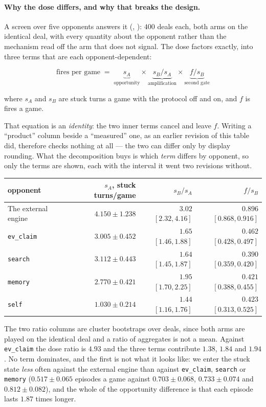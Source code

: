 \documentclass[11pt,letterpaper]{article}
\begin{document}
\paragraph{Why the dose differs, and why that breaks the design.} A screen over
five opponents answers it
(, ):
$400$ deals each, both arms on the identical deal, with every quantity about
the opponent rather than the mechanism read off the arm that does not signal.
The dose factors exactly, into three terms that are each opponent-dependent:

\[
\text{fires per game} \;=\;
\underbrace{s_A}_{\text{opportunity}} \times
\underbrace{s_B / s_A}_{\text{amplification}} \times
\underbrace{f / s_B}_{\text{second gate}}
\]

\noindent where $s_A$ and $s_B$ are stuck turns a game with the protocol off
and on, and $f$ is fires a game.

\noindent That equation is an \emph{identity}: the two inner terms cancel and
leave $f$. Writing a ``product'' column beside a ``measured'' one, as an
earlier revision of this table did, therefore checks nothing at all --- the
two can differ only by display rounding. What the decomposition buys is which
\emph{term} differs by opponent, so only the terms are shown, each with the
interval it went two revisions without.

\begin{center}
\small
\begin{tabular}{lrrr}
\toprule
opponent & $s_A$, stuck turns/game & $s_B/s_A$ & $f/s_B$ \\
\midrule
The external engine & $4.150 \pm 1.238$ & $3.02$ $[2.32, 4.16]$ & $0.896$ $[0.868, 0.916]$ \\
\texttt{ev\_claim}  & $3.005 \pm 0.452$ & $1.65$ $[1.46, 1.88]$ & $0.462$ $[0.428, 0.497]$ \\
\texttt{search}     & $3.112 \pm 0.443$ & $1.64$ $[1.45, 1.87]$ & $0.390$ $[0.359, 0.420]$ \\
\texttt{memory}     & $2.770 \pm 0.421$ & $1.95$ $[1.70, 2.25]$ & $0.421$ $[0.388, 0.455]$ \\
\texttt{self}       & $1.030 \pm 0.214$ & $1.44$ $[1.16, 1.76]$ & $0.423$ $[0.313, 0.525]$ \\
\bottomrule
\end{tabular}
\end{center}

\noindent The two ratio columns are cluster bootstraps over deals, since both
arms are played on the identical deal and a ratio of aggregates is not a mean.
Against \texttt{ev\_claim} the dose ratio is $4.93$ and the three terms
contribute $1.38$, $1.84$ and $1.94$. No term dominates, and the first is not
what it looks like: we enter the stuck state \emph{less} often against
the external engine than against \texttt{ev\_claim}, \texttt{search} or
\texttt{memory} ($0.517 \pm 0.065$ episodes a game against $0.703 \pm 0.068$,
$0.733 \pm 0.074$ and $0.812 \pm 0.082$), and the whole of the opportunity
difference is that each episode lasts $1.87$ times longer.
\end{document}
